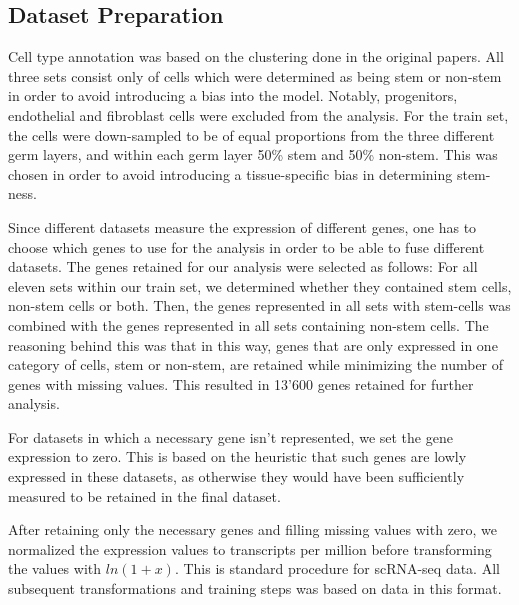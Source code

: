 \documentclass[10pt,conference,compsocconf]{IEEEtran}
\begin{document}
\subsection{Dataset Preparation}
Cell type annotation was based on the clustering done in the original papers. All three sets consist only of cells which were determined as being stem or non-stem in order to avoid introducing a bias into the model. Notably, progenitors, endothelial and fibroblast cells were excluded from the analysis. For the train set, the cells were down-sampled to be of equal proportions from the three different germ layers, and within each germ layer 50\% stem and 50\% non-stem. This was chosen in order to avoid introducing a tissue-specific bias in determining stem-ness. 
\par
Since different datasets measure the expression of different genes, one has to choose which genes to use for the analysis in order to be able to fuse different datasets. The genes retained for our analysis were selected as follows: For all eleven sets within our train set, we determined whether they contained stem cells, non-stem cells or both. Then, the genes represented in all sets with stem-cells was combined with the genes represented in all sets containing non-stem cells. The reasoning behind this was that in this way, genes that are only expressed in one category of cells, stem or non-stem, are retained while minimizing the number of genes with missing values. This resulted in 13'600 genes retained for further analysis.
\par
For datasets in which a necessary gene isn't represented, we set the gene expression to zero. This is based on the heuristic that such genes are lowly expressed in these datasets, as otherwise they would have been sufficiently measured to be retained in the final dataset. 
\par
After retaining only the necessary genes and filling missing values with zero, we normalized the expression values to transcripts per million before transforming the values with $ln(1+x)$. This is standard procedure for scRNA-seq data. All subsequent transformations and training steps was based on data in this format. 
\end{document}
